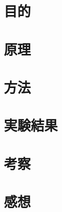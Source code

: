 \documentclass[a4j,11pt,titlepage]{ltjsarticle}
\title{}
\date{\today}
\author{}
\begin{document}
\maketitle
\section{目的}
\label{section:目的}



\section{原理}
\label{section:原理}



\section{方法}
\label{section:方法}



\section{実験結果}
\label{section:実験結果}



\section{考察}
\label{section:考察}



\section{感想}



\end{document}
